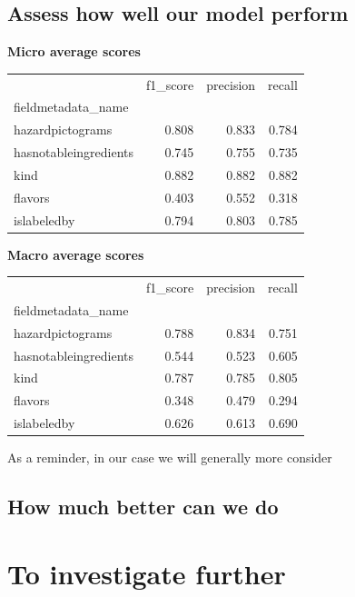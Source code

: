 \subsection{Assess how well our model perform}

\textbf{Micro average scores}
\begin{tabular}{lrrr}
\toprule
{} &  f1\_score &  precision &   recall \\
fieldmetadata\_name    &           &            &          \\
\midrule
hazardpictograms      &   0.808 &    0.833 &  0.784 \\
hasnotableingredients &   0.745 &    0.755 &  0.735 \\
kind                  &   0.882 &    0.882 &  0.882 \\
flavors               &   0.403 &    0.552 &  0.318 \\
islabeledby           &   0.794 &    0.803 &  0.785 \\
\bottomrule
\end{tabular}

\textbf{Macro average scores}
\begin{tabular}{lrrr}
\toprule
{} &  f1\_score &  precision &   recall \\
fieldmetadata\_name    &           &            &          \\
\midrule
hazardpictograms      &   0.788 &    0.834 &  0.751 \\
hasnotableingredients &   0.544 &    0.523 &  0.605 \\
kind                  &   0.787 &    0.785 &  0.805 \\
flavors               &   0.348 &    0.479 &  0.294 \\
islabeledby           &   0.626 &    0.613 &  0.690 \\
\bottomrule
\end{tabular}

As a reminder, in our case we will generally more consider 



\subsection{How much better can we do}




\section{To investigate further}

